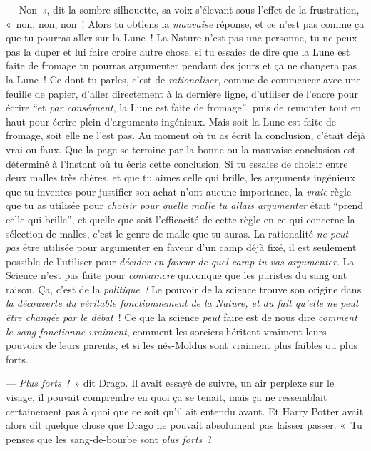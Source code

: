--- Non~», dit la sombre silhouette, sa voix s'élevant sous l'effet de la frustration, «~non, non, non~! Alors tu obtiens la \emph{mauvaise} réponse, et ce n'est pas comme ça que tu pourras aller sur la Lune~! La Nature n'est pas une personne, tu ne peux pas la duper et lui faire croire autre chose, si tu essaies de dire que la Lune est faite de fromage tu pourras argumenter pendant des jours et ça ne changera pas la Lune~! Ce dont tu parles, c'est de \emph{rationaliser}, comme de commencer avec une feuille de papier, d'aller directement à la dernière ligne, d'utiliser de l'encre pour écrire “et \emph{par conséquent}, la Lune est faite de fromage”, puis de remonter tout en haut pour écrire plein d'arguments ingénieux. Mais soit la Lune est faite de fromage, soit elle ne l'est pas. Au moment où tu as écrit la conclusion, c'était déjà vrai ou faux. Que la page se termine par la bonne ou la mauvaise conclusion est déterminé à l'instant où tu écris cette conclusion. Si tu essaies de choisir entre deux malles très chères, et que tu aimes celle qui brille, les arguments ingénieux que tu inventes pour justifier son achat n'ont aucune importance, la \emph{vraie} règle que tu as utilisée pour \emph{choisir pour quelle malle tu allais argumenter} était “prend celle qui brille”, et quelle que soit l'efficacité de cette règle en ce qui concerne la sélection de malles, c'est le genre de malle que tu auras. La rationalité \emph{ne peut pas} être utilisée pour argumenter en faveur d'un camp déjà fixé, il est seulement possible de l'utiliser pour \emph{décider en faveur de quel camp tu vas argumenter}. La Science n'est pas faite pour \emph{convaincre} quiconque que les puristes du sang ont raison. Ça, c'est de la \emph{politique~!} Le pouvoir de la science trouve son origine dans \emph{la découverte du véritable fonctionnement de la Nature, et du fait qu'elle ne peut être changée par le débat}~! Ce que la science \emph{peut} faire est de nous dire \emph{comment le sang fonctionne vraiment}, comment les sorciers héritent vraiment leurs pouvoirs de leurs parents, et si les nés-Moldus sont vraiment plus faibles ou plus forts…

--- \emph{Plus forts~!}~» dit Drago. Il avait essayé de suivre, un air perplexe sur le visage, il pouvait comprendre en quoi ça se tenait, mais ça ne ressemblait certainement pas à quoi que ce soit qu'il ait entendu avant. Et Harry Potter avait alors dit quelque chose que Drago ne pouvait absolument pas laisser passer. «~Tu penses que les sang-de-bourbe sont \emph{plus forts}~?

